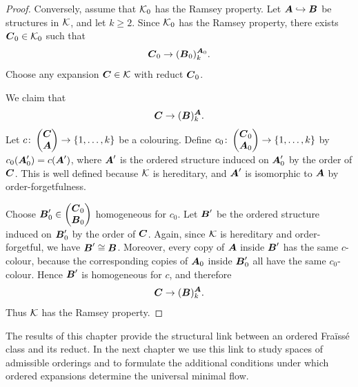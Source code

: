 \begin{proof}
    Conversely, assume that \(\mathcal{K}_0\) has the Ramsey property. Let \(\boldsymbol{A}\hookrightarrow \boldsymbol{B}\) be structures in \(\mathcal{K}\), and let \(k\geq 2\). Since \(\mathcal{K}_0\) has the Ramsey property, there exists \(\boldsymbol{C}_0\in\mathcal{K}_0\)
    such that
    \[
        \boldsymbol{C}_0\to (\boldsymbol{B}_0)^{\boldsymbol{A}_0}_k.
    \]
    Choose any expansion \(\boldsymbol{C}\in\mathcal{K}\) with reduct \(\boldsymbol{C}_0\).

    We claim that
    \[
        \boldsymbol{C}\to (\boldsymbol{B})^{\boldsymbol{A}}_k.
    \]
    Let \(c\colon \begin{pmatrix} \boldsymbol{C} \\ \boldsymbol{A} \end{pmatrix}\to\{1,\dots,k\}\)
    be a colouring. Define
    \(c_0\colon \begin{pmatrix} \boldsymbol{C}_0 \\ \boldsymbol{A}_0 \end{pmatrix}\to\{1,\dots,k\}\)
    by \(c_0(\boldsymbol{A}_0')=c(\boldsymbol{A}')\),
    where \(\boldsymbol{A}'\) is the ordered structure induced on \(\boldsymbol{A}_0'\) by the order of \(\boldsymbol{C}\). This is well defined because \(\mathcal{K}\) is hereditary, and \(\boldsymbol{A}'\) is isomorphic to \(\boldsymbol{A}\) by order-forgetfulness.

    Choose \(\boldsymbol{B}_0'\in \begin{pmatrix} \boldsymbol{C}_0 \\ \boldsymbol{B}_0 \end{pmatrix}\)
    homogeneous for \(c_0\). Let \(\boldsymbol{B}'\) be the ordered structure induced on \(\boldsymbol{B}_0'\) by the order of \(\boldsymbol{C}\). Again, since \(\mathcal{K}\) is hereditary and order-forgetful, we have \(\boldsymbol{B}'\cong \boldsymbol{B}\).
    Moreover, every copy of \(\boldsymbol{A}\) inside \(\boldsymbol{B}'\) has the same \(c\)-colour, because the corresponding copies of \(\boldsymbol{A}_0\) inside \(\boldsymbol{B}_0'\) all have the same \(c_0\)-colour. Hence \(\boldsymbol{B}'\) is homogeneous for \(c\), and therefore
    \[
        \boldsymbol{C}\to (\boldsymbol{B})^{\boldsymbol{A}}_k.
    \]
    Thus \(\mathcal{K}\) has the Ramsey property.
\end{proof}
The results of this chapter provide the structural link between an ordered Fraïssé class and its reduct. In the next chapter we use this link to study spaces of admissible orderings and to formulate the additional conditions under which ordered expansions determine the universal minimal flow.
